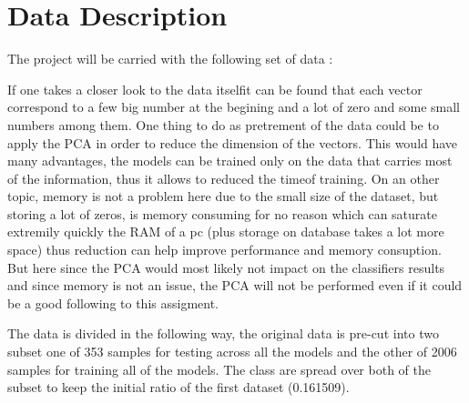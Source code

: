 \section{Data Description}

The project will be carried with the following set of data :

If one takes a closer look to the data itselfit can be found that each vector correspond to a few big number at the begining and a lot of zero and some small numbers among them. One thing to do as pretrement of the data could be to apply the PCA in order to reduce the dimension of the vectors. This would have many advantages, the models can be trained only on the data that carries most of the information, thus it allows to reduced the timeof training. On an other topic, memory is not a problem here due to the small size of the dataset, but storing a lot of zeros, is memory consuming for no reason which can saturate extremily quickly the RAM of a pc (plus storage on database takes a lot more space) thus reduction can help improve performance and memory consuption. But here since the PCA would most likely not impact on the classifiers results and since memory is not an issue, the PCA will not be performed even if it could be a good following to this assigment.

The data is divided in the following way, the original data is pre-cut into two subset one of 353 samples for testing across all the models and the other of 2006 samples for training all of the models. The class are spread over both of the subset to keep the initial ratio of the first dataset (0.161509).
